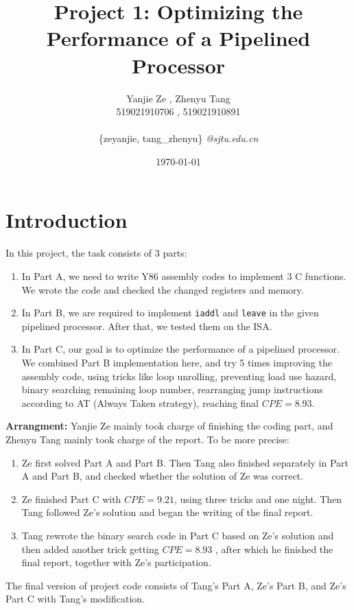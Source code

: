 \documentclass{article}
\title{\textbf{Project 1: Optimizing the Performance of a Pipelined Processor}} %
\author{Yanjie Ze , Zhenyu Tang\\
 519021910706 , 519021910891\\
\\ \{zeyanjie, tang\_zhenyu\}  \textit{@sjtu.edu.cn} \\
   } %
\date{\today} %
\begin{document}
\maketitle %

\section{Introduction}

\hspace{1 em}
\par In this project, the task consists of 3 parts:
\begin{enumerate}
    \item In Part A, we need to write Y86 assembly codes to implement 3 C functions. We wrote the code and checked the changed registers and memory.
    \item In Part B, we are required to implement \lstinline{iaddl} and \lstinline{leave} in the given pipelined processor. After that, we tested them on the ISA.
    \item In Part C, our goal is to optimize the performance of a pipelined processor. We combined Part B implementation here, and try 5 times improving the assembly code, using tricks like loop unrolling, preventing load use hazard, binary searching remaining loop number, rearranging jump instructions according to AT (Always Taken strategy), reaching final $CPE=8.93$.
\end{enumerate}

\textbf{Arrangment:} Yanjie Ze mainly took charge of finishing the coding part, and Zhenyu Tang mainly took charge of the report. To be more precise:
\begin{enumerate}
    \item Ze first solved Part A and Part B. Then Tang also finished separately in Part A and Part B, and checked whether the solution of Ze was correct.
    \item Ze finished Part C with $CPE=9.21$, using three tricks and one night. Then Tang followed Ze's solution and began the writing of the final report.
    \item Tang rewrote the binary search code in Part C based on Ze's solution and then added another trick getting $CPE=8.93$ , after which he finished the final report, together with Ze's participation.
\end{enumerate}
\par The final version of project code consists of Tang's Part A, Ze's Part B, and Ze's Part C with Tang's modification.
\end{document}
